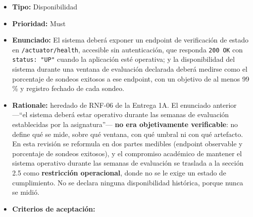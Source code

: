 \documentclass[
  spanish,
]{article}
\providecommand{\tightlist}{%
  \setlength{\itemsep}{0pt}\setlength{\parskip}{0pt}}
\begin{document}
\begin{itemize}
\tightlist
\item
  \textbf{Tipo:} Disponibilidad
\item
  \textbf{Prioridad:} Must
\item
  \textbf{Enunciado:} El sistema deberá exponer un endpoint de
  verificación de estado en \texttt{/\allowbreak{}actuator/\allowbreak{}health}, accesible sin
  autenticación, que responda \texttt{200\ OK} con
  \texttt{status:\ "UP"} cuando la aplicación esté operativa; y la
  disponibilidad del sistema durante una ventana de evaluación declarada
  deberá medirse como el porcentaje de sondeos exitosos a ese endpoint,
  con un objetivo de al menos 99 \% y registro fechado de cada sondeo.
\item
  \textbf{Rationale:} heredado de RNF-06 de la Entrega 1A. El enunciado
  anterior ---``el sistema deberá estar operativo durante las semanas de
  evaluación establecidas por la asignatura''--- \textbf{no era
  objetivamente verificable}: no define qué se mide, sobre qué ventana,
  con qué umbral ni con qué artefacto. En esta revisión se reformula en
  dos partes medibles (endpoint observable y porcentaje de sondeos
  exitosos), y el compromiso académico de mantener el sistema operativo
  durante las semanas de evaluación se traslada a la sección 2.5 como
  \textbf{restricción operacional}, donde no se le exige un estado de
  cumplimiento. No se declara ninguna disponibilidad histórica, porque
  nunca se midió.
\item
  \textbf{Criterios de aceptación:}


\end{itemize}
\end{document}
